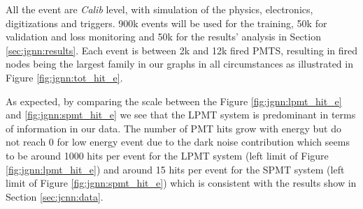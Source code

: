\documentclass[../main.tex]{subfiles}
\begin{document}
All the event are \textit{Calib} level, with simulation of the physics, electronics, digitizations and triggers. 900k events will be used for the training, 50k for validation and loss monitoring and 50k for the results' analysis in Section \ref{sec:jgnn:results}. Each event is between 2k and 12k fired PMTS, resulting in fired nodes being the largest family in our graphs in all circumstances as illustrated in Figure \ref{fig:jgnn:tot_hit_e}.

As expected, by comparing the scale between the Figure \ref{fig:jgnn:lpmt_hit_e} and \ref{fig:jgnn:spmt_hit_e} we see that the LPMT system is predominant in terms of information in our data. The number of PMT hits grow with energy but do not reach 0 for low energy event due to the dark noise contribution which seems to be around 1000 hits per event for the LPMT system (left limit of Figure \ref{fig:jgnn:lpmt_hit_e}) and around 15 hits per event for the SPMT system (left limit of Figure \ref{fig:jgnn:spmt_hit_e}) which is consistent with the results show in Section \ref{sec:jcnn:data}.
\end{document}
